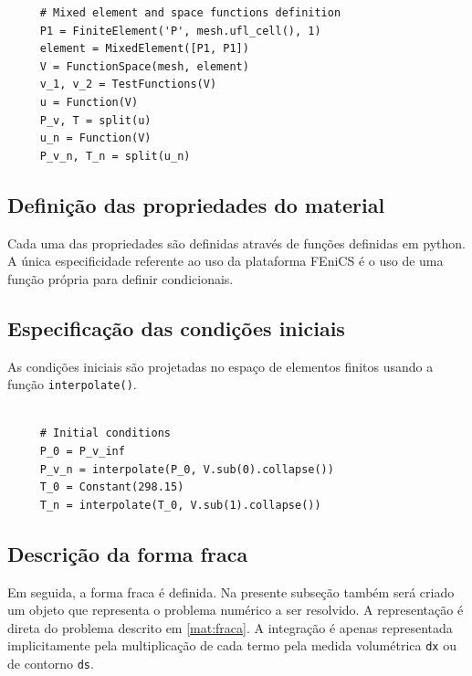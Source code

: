      \begin{verbatim}
     # Mixed element and space functions definition
     P1 = FiniteElement('P', mesh.ufl_cell(), 1)
     element = MixedElement([P1, P1])
     V = FunctionSpace(mesh, element)
     v_1, v_2 = TestFunctions(V)
     u = Function(V)
     P_v, T = split(u)
     u_n = Function(V)
     P_v_n, T_n = split(u_n)

    \end{verbatim} 
   
    \subsection{Definição das propriedades do material}
    Cada uma das propriedades são definidas através de funções definidas em
    python. A única especificidade referente ao uso da plataforma FEniCS é o uso
    de uma função própria para definir condicionais. 

    \subsection{Especificação das condições iniciais}
    As condições iniciais são projetadas no espaço de elementos finitos usando a
    função \texttt{interpolate()}.
    
    \begin{verbatim}
     
     # Initial conditions
     P_0 = P_v_inf
     P_v_n = interpolate(P_0, V.sub(0).collapse())
     T_0 = Constant(298.15)
     T_n = interpolate(T_0, V.sub(1).collapse())
    \end{verbatim} 

    \subsection{Descrição da forma fraca}
    Em seguida, a forma fraca é definida. Na presente subseção também será
    criado um objeto que representa o problema numérico a ser resolvido.
    A representação é direta do problema descrito em \ref{mat:fraca}. A
    integração é apenas representada implicitamente pela
    multiplicação de cada termo pela medida volumétrica
    \texttt{dx} ou de contorno
    \texttt{ds}.

